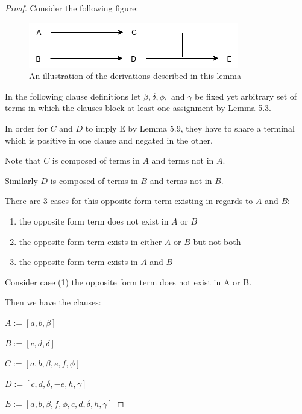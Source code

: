 \documentclass[manuscript]{acmart}
\begin{document}
    \begin{proof}
        Consider the following figure:

        \begin{figure}[h]
            \includegraphics[scale=0.8]{519a}
            \caption{An illustration of the derivations described in this lemma}
        \end{figure}

        In the following clause definitions let $\beta, \delta, \phi,$ and $\gamma$ be fixed yet arbitrary set of terms in which the clauses block at least one assignment by Lemma 5.3.

        In order for $C$ and $D$ to imply E by Lemma 5.9, they have to share a terminal which is positive in one clause and negated in the other.

        Note that $C$ is composed of terms in $A$ and terms not in $A$.

        Similarly $D$ is composed of terms in $B$ and terms not in $B$.

        There are 3 cases for this opposite form term existing in regards to $A$ and $B$:
        \begin{enumerate}
            \item the opposite form term does not exist in $A$ or $B$
            \item the opposite form term exists in either $A$ or $B$ but not both
            \item the opposite form term exists in $A$ and $B$
        \end{enumerate}
        
        Consider case (1) the opposite form term does not exist in A or B.

        Then we have the clauses:

        $A := [a, b, \beta]$

        $B := [c, d, \delta]$

        $C := [a, b, \beta, e, f, \phi]$

        $D := [c, d, \delta, -e, h, \gamma]$

        $E := [a, b, \beta, f, \phi, c, d, \delta, h, \gamma]$


\end{proof}
\end{document}

